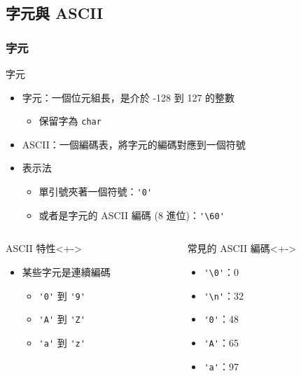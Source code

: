 \documentclass[utf8]{beamer}
\begin{document}
\begin{CJK}{UTF8}{bkai}
\subsection{字元與 ASCII}

\begin{frame}[fragile]
  \frametitle{字元}
  \begin{exampleblock}{字元}
    \begin{itemize}[<+->]
    \item 字元：一個位元組長，是介於 -128 到 127 的\alert{整數}
      \begin{itemize}
      \item 保留字為 \lstinline{char}{}
      \end{itemize}
    \item ASCII：一個編碼表，將字元的編碼對應到一個符號
    \item 表示法
      \begin{itemize}
      \item 單引號夾著一個符號：\lstinline{'0'}{}
      \item 或者是字元的 ASCII 編碼 (8 進位)：\lstinline{'\60'}{} 
      \end{itemize}
    \end{itemize}
  \end{exampleblock}
  \begin{columns}[T]
    \begin{column}[T]{5.5cm}
    \begin{alertblock}{ASCII 特性}<+->
      \begin{itemize}
      \item 某些字元是連續編碼
        \begin{itemize}[<+->]
        \item \lstinline{'0'}{} 到 \lstinline{'9'}{}
        \item \lstinline{'A'}{} 到 \lstinline{'Z'}{}
        \item \lstinline{'a'}{} 到 \lstinline{'z'}{}
        \end{itemize}
      \end{itemize}
    \end{alertblock}
    \end{column}
    \begin{column}[T]{5.5cm}
    \begin{block}{常見的 ASCII 編碼}<+->
    \begin{multicols}{2}
      \begin{itemize}[<+->]
      \item \lstinline{'\0'}{}：0
      \item \lstinline{'\n'}{}：32
      \item \lstinline{'0'}{}：48
      \item \lstinline{'A'}{}：65
      \item \lstinline{'a'}{}：97
      \end{itemize}
    \end{multicols}
    \end{block}
    \end{column}
  \end{columns}
\end{frame}


\end{CJK}
\end{document}
